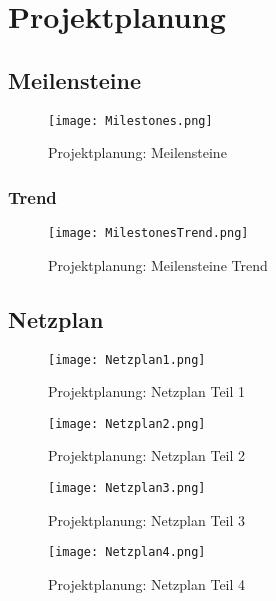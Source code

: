 
\section{Projektplanung}

\subsection{Meilensteine}

\begin{figure}[H]
\centering
\texttt{[image: Milestones.png]}
\caption{Projektplanung: Meilensteine}
\label{fig:Meilensteine}
\end{figure}

\subsubsection{Trend}

\begin{figure}[H]
\centering
\texttt{[image: MilestonesTrend.png]}
\caption{Projektplanung: Meilensteine Trend}
\label{fig:MeilensteinTrend}
\end{figure}

\subsection{Netzplan}

\begin{figure}[H]
\centering
\texttt{[image: Netzplan1.png]}
\caption{Projektplanung: Netzplan Teil 1}
\label{fig:Netzplan1}
\end{figure}

\begin{figure}[H]
\centering
\texttt{[image: Netzplan2.png]}
\caption{Projektplanung: Netzplan Teil 2}
\label{fig:Netzplan2}
\end{figure}

\begin{figure}[H]
\centering
\texttt{[image: Netzplan3.png]}
\caption{Projektplanung: Netzplan Teil 3}
\label{fig:Netzplan3}
\end{figure}

\begin{figure}[H]
\centering
\texttt{[image: Netzplan4.png]}
\caption{Projektplanung: Netzplan Teil 4}
\label{fig:Netzplan4}
\end{figure}





